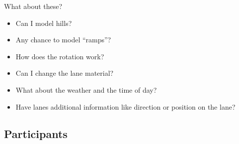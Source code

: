 \documentclass[aspectratio=169]{beamer}
\begin{document}
\begin{frame}{What about these?}
    \begin{itemize}[<+(1)->] %
        \item Can I model hills?
        \item Any chance to model ``ramps''?
        \item How does the rotation work?
        \item Can I change the lane material?
        \item What about the weather and the time of day?
        \item Have lanes additional information like direction or position on the lane?
    \end{itemize}
\end{frame}

\subsection{Participants}
\end{document}
